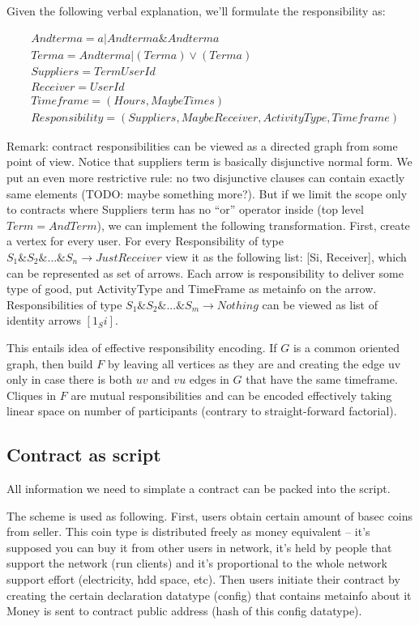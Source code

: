 \documentclass[]{itmo-student-thesis}
\begin{document}
Given the following verbal explanation, we’ll formulate the responsibility as:

\begin{align*}
&Andterm a = a | Andterm a \& Andterm a \\
&Term a = Andterm a | (Term a) \vee (Term a) \\
&Suppliers = Term UserId\\
&Receiver = UserId\\
&Timeframe = (Hours, Maybe Times)\\
&Responsibility = (Suppliers, Maybe Receiver, ActivityType, Timeframe)
\end{align*}

Remark: contract responsibilities can be viewed as a directed graph
from some point of view. Notice that suppliers term is basically
disjunctive normal form. We put an even more restrictive rule: no two
disjunctive clauses can contain exactly same elements (TODO: maybe
something more?). But if we limit the scope only to contracts where
Suppliers term has no “or” operator inside (top level $Term =
AndTerm$), we can implement the following transformation. First,
create a vertex for every user. For every Responsibility of type
$S_1\&S_2\&…\&S_n \rightarrow Just Receiver$ view it as the following
list: [Si, Receiver], which can be represented as set of arrows. Each
arrow is responsibility to deliver some type of good, put ActivityType
and TimeFrame as metainfo on the arrow. Responsibilities of type
$S_1\&S_2\&...\&S_m \rightarrow Nothing$ can be viewed as list of
identity arrows $[1_Si]$.

This entails idea of effective responsibility encoding. If $G$ is a
common oriented graph, then build $F$ by leaving all vertices as they
are and creating the edge uv only in case there is both $uv$ and $vu$
edges in $G$ that have the same timeframe. Cliques in $F$ are mutual
responsibilities and can be encoded effectively taking linear space on
number of participants (contrary to straight-forward factorial).

\subsection{Contract as script}

All information we need to simplate a contract can be packed into the
script.

The scheme is used as following. First, users obtain certain amount of
basec coins from seller. This coin type is distributed freely as money
equivalent -- it’s supposed you can buy it from other users in
network, it’s held by people that support the network (run clients)
and it’s proportional to the whole network support effort
(electricity, hdd space, etc). Then users initiate their contract by
creating the certain declaration datatype (config) that contains
metainfo about it Money is sent to contract public address (hash of
this config datatype).
\end{document}
